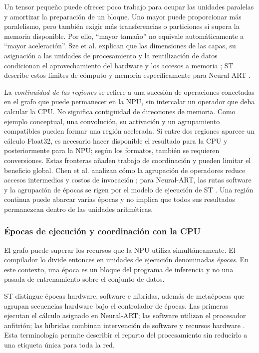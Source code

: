 Un tensor pequeño puede ofrecer poco trabajo para ocupar las unidades paralelas y amortizar la preparación de un bloque. Uno mayor puede proporcionar más paralelismo, pero también exigir más transferencias o particiones si supera la memoria disponible. Por ello, ``mayor tamaño'' no equivale automáticamente a ``mayor aceleración''. Sze et al. explican que las dimensiones de las capas, su asignación a las unidades de procesamiento y la reutilización de datos condicionan el aprovechamiento del hardware y los accesos a memoria \cite{cap4_sze2017}; ST describe estos límites de cómputo y memoria específicamente para Neural-ART \cite{cap4_stconcepts}.

La \emph{continuidad de las regiones} se refiere a una sucesión de operaciones conectadas en el grafo que puede permanecer en la NPU, sin intercalar un operador que deba calcular la CPU. No significa contigüidad de direcciones de memoria. Como ejemplo conceptual, una convolución, su activación y un agrupamiento compatibles pueden formar una región acelerada. Si entre dos regiones aparece un cálculo Float32, es necesario hacer disponible el resultado para la CPU y posteriormente para la NPU; según los formatos, también se requieren conversiones. Estas fronteras añaden trabajo de coordinación y pueden limitar el beneficio global. Chen et al. analizan cómo la agrupación de operadores reduce accesos intermedios y costos de invocación \cite{cap4_tvm2018}; para Neural-ART, las rutas software y la agrupación de épocas se rigen por el modelo de ejecución de ST \cite{cap4_stconcepts}. Una región continua puede abarcar varias épocas y no implica que todos sus resultados permanezcan dentro de las unidades aritméticas.

\subsubsection{Épocas de ejecución y coordinación con la CPU}
El grafo puede superar los recursos que la NPU utiliza simultáneamente. El compilador lo divide entonces en unidades de ejecución denominadas \emph{épocas}. En este contexto, una época es un bloque del programa de inferencia y no una pasada de entrenamiento sobre el conjunto de datos.

ST distingue épocas hardware, software e híbridas, además de metaépocas que agrupan secuencias hardware bajo el controlador de épocas. Las primeras ejecutan el cálculo asignado en Neural-ART; las software utilizan el procesador anfitrión; las híbridas combinan intervención de software y recursos hardware \cite{cap4_stconcepts}. Esta terminología permite describir el reparto del procesamiento sin reducirlo a una etiqueta única para toda la red.

